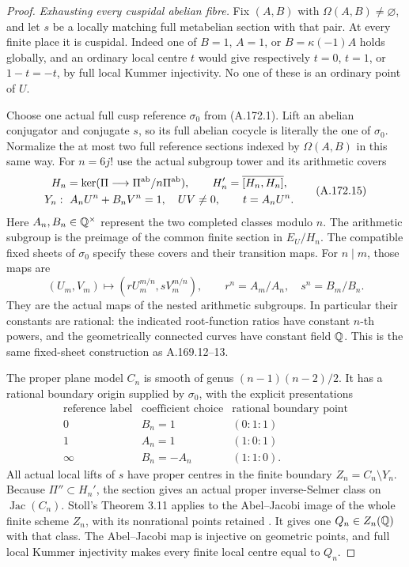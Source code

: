 \begin{proof}
\emph{Exhausting every cuspidal abelian fibre.}
Fix \((A,B)\) with \(\Omega(A,B)\ne\varnothing\), and
let \(s\) be a locally matching full metabelian section with
that pair.  At every finite place it is cuspidal.  Indeed one of
\(B=1\), \(A=1\), or \(B=\kappa(-1)A\) holds globally,
and an ordinary local centre \(t\) would give respectively
\(t=0\), \(t=1\), or \(1-t=-t\), by full local Kummer
injectivity.  No one of these is an ordinary point of \(U\).

Choose one actual full cusp reference \(\sigma_0\) from
(A.172.1).  Lift an abelian conjugator and conjugate \(s\), so
its full abelian cocycle is literally the one of \(\sigma_0\).
Normalize the at most two full reference sections indexed by
\(\Omega(A,B)\) in this same way.  For \(n=6j!\) use the
actual subgroup tower and its arithmetic covers
\[
 \begin{gathered}
 H_n=\ker(\Pi\longrightarrow\Pi^{\rm ab}/n\Pi^{\rm ab}),
                \qquad H_n'=\overline{[H_n,H_n]},\\
 Y_n:\ A_nU^n+B_nV^n=1,\quad UV\ne0,
                    \qquad t=A_nU^n.
 \end{gathered}
\tag{A.172.15}
\]
Here \(A_n,B_n\in\mathbb Q^\times\) represent the two completed
classes modulo \(n\).  The arithmetic subgroup is the preimage
of the common finite section in \(E_U/H_n\).  The compatible
fixed sheets of \(\sigma_0\) specify these covers and their
transition maps.  For \(n\mid m\), those maps are
\[
  (U_m,V_m)\longmapsto(rU_m^{m/n},sV_m^{m/n}),\qquad
         r^n=A_m/A_n,\quad s^n=B_m/B_n.
\tag{A.172.16}
\]
They are the actual maps of the nested arithmetic subgroups.  In
particular their constants are rational: the indicated root-function
ratios have constant \(n\)-th powers, and the geometrically
connected curves have constant field \(\mathbb Q\).  This is the
same fixed-sheet construction as A.169.12--13.

The proper plane model \(C_n\) is smooth of genus
\((n-1)(n-2)/2\).  It has a rational boundary origin supplied
by \(\sigma_0\), with the explicit presentations
\[
 \begin{array}{c|c|c}
 \text{reference label}&\text{coefficient choice}&\text{rational boundary point}\\\hline
 0&B_n=1&(0:1:1)\\
 1&A_n=1&(1:0:1)\\
 \infty&B_n=-A_n&(1:1:0).
 \end{array}
\tag{A.172.17}
\]
All actual local lifts of \(s\) have proper centres in the
finite boundary \(Z_n=C_n\setminus Y_n\).  Because
\(\Pi''\subset H_n'\), the section gives an actual proper
inverse-Selmer class on \(\operatorname{Jac}(C_n)\).
Stoll's Theorem 3.11 applies to the Abel--Jacobi image of the
whole finite scheme \(Z_n\), with its nonrational points
retained \cite[Theorem 3.11]{LegStoll2007}.  It gives one
\(Q_n\in Z_n(\mathbb Q)\) with that class.  The Abel--Jacobi map
is injective on geometric points, and full local Kummer
injectivity makes every finite local centre equal to \(Q_n\).


\end{proof}
